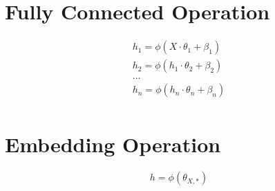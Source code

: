 \section{Fully Connected Operation}
\begin{gather}
    h_1 = \phi(X \cdot \theta_1 + \beta_1) \\
    h_2 = \phi(h_1 \cdot \theta_2 + \beta_2) \\
    \dots \\ 
    h_n = \phi(h_n \cdot \theta_n + \beta_n)\\
\end{gather}

\section{Embedding Operation}
\begin{equation}
    h = \phi(\theta_{X,*})
\end{equation}

